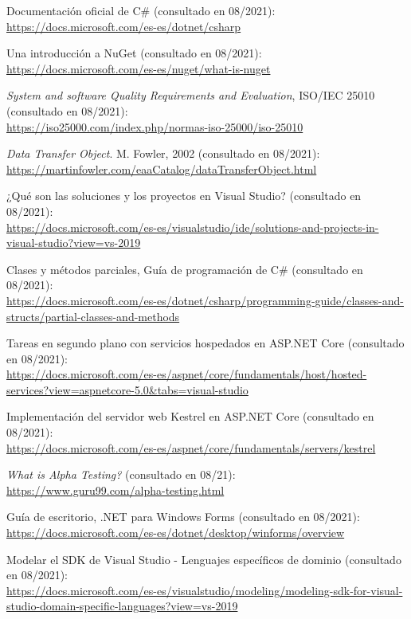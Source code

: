 \documentclass[11pt,spanish,listoffigures]{tfgetsinf}
\begin{document}
\begin{thebibliography}{10}
Documentación oficial de C\# (consultado en 08/2021):\\
\url{https://docs.microsoft.com/es-es/dotnet/csharp}

Una introducción a NuGet (consultado en 08/2021):\\
\url{https://docs.microsoft.com/es-es/nuget/what-is-nuget}

\emph{System and software Quality Requirements and Evaluation}, ISO/IEC 25010 (consultado en 08/2021):\\
\url{https://iso25000.com/index.php/normas-iso-25000/iso-25010}

\emph{Data Transfer Object}.
\newblock M. Fowler, 2002 (consultado en 08/2021):\\
\url{https://martinfowler.com/eaaCatalog/dataTransferObject.html}

¿Qué son las soluciones y los proyectos en Visual Studio? (consultado en 08/2021):\\
\url{https://docs.microsoft.com/es-es/visualstudio/ide/solutions-and-projects-in-visual-studio?view=vs-2019}

Clases y métodos parciales, Guía de programación de C\# (consultado en 08/2021):\\
\url{https://docs.microsoft.com/es-es/dotnet/csharp/programming-guide/classes-and-structs/partial-classes-and-methods}

Tareas en segundo plano con servicios hospedados en ASP.NET Core (consultado en 08/2021):\\
\url{https://docs.microsoft.com/es-es/aspnet/core/fundamentals/host/hosted-services?view=aspnetcore-5.0&tabs=visual-studio}

Implementación del servidor web Kestrel en ASP.NET Core (consultado en 08/2021):\\
\url{https://docs.microsoft.com/es-es/aspnet/core/fundamentals/servers/kestrel}

\emph{What is Alpha Testing?} (consultado en 08/21):\\
\url{https://www.guru99.com/alpha-testing.html}

Guía de escritorio, .NET para Windows Forms (consultado en 08/2021):\\
\url{https://docs.microsoft.com/es-es/dotnet/desktop/winforms/overview}

Modelar el SDK de Visual Studio - Lenguajes específicos de dominio (consultado en 08/2021):\\
\url{https://docs.microsoft.com/es-es/visualstudio/modeling/modeling-sdk-for-visual-studio-domain-specific-languages?view=vs-2019}


\end{thebibliography}
\end{document}
